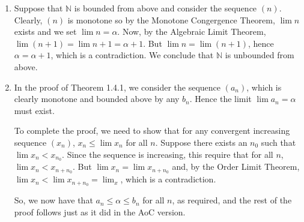 \documentclass[a4paper]{report}
\newenvironment{ex}[1]
    {\noindent{\large \bf Exercise #1.}}{\vspace{0.5cm}}
\begin{document}
\begin{ex}{2.4.4}

  \begin{enumerate}[label=\alph*)]
  \item Suppose that $\mathbb{N}$ is bounded from above and consider the
    sequence $(n)$. Clearly, $(n)$ is monotone so by the Monotone Congergence
    Theorem, $\lim n$ exists and we set $\lim n = \alpha$. Now, by the Algebraic
    Limit Theorem, $\lim (n + 1) = \lim n + 1 = \alpha + 1$. But $\lim n = \lim
    (n + 1)$, hence $\alpha = \alpha + 1$, which is a contradiction. We conclude
    that $\mathbb{N}$ is unbounded from above.
  \item In the proof of Theorem 1.4.1, we consider the sequence $(a_n)$, which
    is clearly monotone and bounded above by any $b_n$. Hence the limit $\lim
    a_n = \alpha$ must exist.

    To complete the proof,
    we need to show that for any convergent increasing sequence $(x_n)$, $x_n
    \leq \lim x_n$ for all $n$. Suppose there exists an $n_0$ such that $\lim
    x_n < x_{n_0}$. Since the sequence is increasing, this require that for all
    $n$, $\lim x_n < x_{n + n_0}$. But $\lim x_n = \lim x_{n + n_0}$ and, by
    the Order Limit Theorem, $\lim x_n < \lim x_{n + n_0} = \lim_x$, which is a
    contradiction.

    So, we now have that $a_n \leq \alpha \leq b_n$ for all $n$, as required,
    and the rest of the proof follows just as it did in the AoC version.
  \end{enumerate}
\end{ex}
\end{document}
